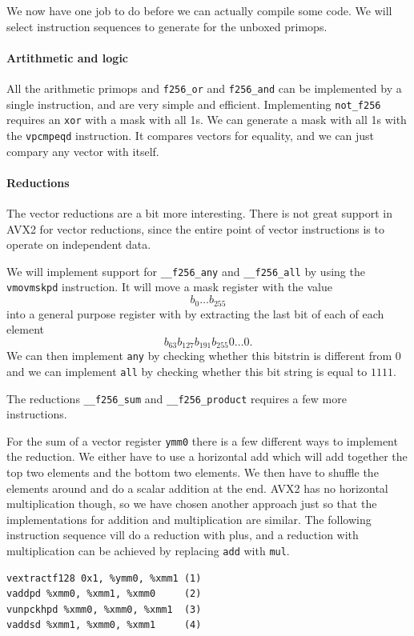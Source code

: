 \documentclass{article}
\begin{document}
We now have one job to do before we can actually compile some code. We will select instruction sequences to generate for the unboxed primops.

\paragraph{Artithmetic and logic}
All the arithmetic primops and \verb!f256_or! and \verb!f256_and! can be implemented by a single instruction, and are very simple and efficient. Implementing \verb!not_f256! requires an \verb!xor! with a mask with all 1s. We can generate a mask with all 1s with the \verb!vpcmpeqd! instruction. It compares vectors for equality, and we can just compary any vector with itself.

\paragraph{Reductions}
The vector reductions are a bit more interesting. There is not great support in AVX2 for vector reductions, since the entire point of vector instructions is to operate on independent data.

We will implement support for \verb!__f256_any! and \verb!__f256_all! by using the \verb!vmovmskpd! instruction. It will move a mask register with the value
\[
    b_0 \ldots b_{255}
\]
into a general purpose register with by extracting the last bit of each of each element
\[
    b_{63}b_{127}b_{191}b_{255}0\ldots0.
\]
We can then implement \verb!any! by checking whether this bitstrin is different from 0 and we can implement \verb!all! by checking whether this bit string is equal to $1111$.

The reductions \verb!__f256_sum! and \verb!__f256_product! requires a few more instructions.

For the sum of a vector register \verb!ymm0! there is a few different ways to implement the reduction. We either have to use a horizontal add which will add together the top two elements and the bottom two elements. We then have to shuffle the elements around and do a scalar addition at the end. AVX2 has no horizontal multiplication though, so we have chosen another approach just so that the implementations for addition and multiplication are similar. The following instruction sequence vill do a reduction with plus, and a reduction with multiplication can be achieved by replacing \verb!add! with \verb!mul!.
\begin{verbatim}
vextractf128 0x1, %ymm0, %xmm1 (1)
vaddpd %xmm0, %xmm1, %xmm0     (2)
vunpckhpd %xmm0, %xmm0, %xmm1  (3)
vaddsd %xmm1, %xmm0, %xmm1     (4)
\end{verbatim}
\end{document}
